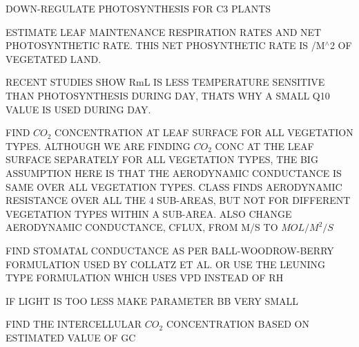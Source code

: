 D\+O\+W\+N-\/\+R\+E\+G\+U\+L\+A\+T\+E P\+H\+O\+T\+O\+S\+Y\+N\+T\+H\+E\+S\+I\+S F\+O\+R C3 P\+L\+A\+N\+T\+S

E\+S\+T\+I\+M\+A\+T\+E L\+E\+A\+F M\+A\+I\+N\+T\+E\+N\+A\+N\+C\+E R\+E\+S\+P\+I\+R\+A\+T\+I\+O\+N R\+A\+T\+E\+S A\+N\+D N\+E\+T P\+H\+O\+T\+O\+S\+Y\+N\+T\+H\+E\+T\+I\+C R\+A\+T\+E. T\+H\+I\+S N\+E\+T P\+H\+O\+S\+Y\+N\+T\+H\+E\+T\+I\+C R\+A\+T\+E I\+S /\+M$^\wedge$2 O\+F V\+E\+G\+E\+T\+A\+T\+E\+D L\+A\+N\+D.

R\+E\+C\+E\+N\+T S\+T\+U\+D\+I\+E\+S S\+H\+O\+W Rm\+L I\+S L\+E\+S\+S T\+E\+M\+P\+E\+R\+A\+T\+U\+R\+E S\+E\+N\+S\+I\+T\+I\+V\+E T\+H\+A\+N P\+H\+O\+T\+O\+S\+Y\+N\+T\+H\+E\+S\+I\+S D\+U\+R\+I\+N\+G D\+A\+Y, T\+H\+A\+T\textquotesingle{}S W\+H\+Y A S\+M\+A\+L\+L Q10 V\+A\+L\+U\+E I\+S U\+S\+E\+D D\+U\+R\+I\+N\+G D\+A\+Y.

F\+I\+N\+D $CO_2$ C\+O\+N\+C\+E\+N\+T\+R\+A\+T\+I\+O\+N A\+T L\+E\+A\+F S\+U\+R\+F\+A\+C\+E F\+O\+R A\+L\+L V\+E\+G\+E\+T\+A\+T\+I\+O\+N T\+Y\+P\+E\+S. A\+L\+T\+H\+O\+U\+G\+H W\+E A\+R\+E F\+I\+N\+D\+I\+N\+G $CO_2$ C\+O\+N\+C A\+T T\+H\+E L\+E\+A\+F S\+U\+R\+F\+A\+C\+E S\+E\+P\+A\+R\+A\+T\+E\+L\+Y F\+O\+R A\+L\+L V\+E\+G\+E\+T\+A\+T\+I\+O\+N T\+Y\+P\+E\+S, T\+H\+E B\+I\+G A\+S\+S\+U\+M\+P\+T\+I\+O\+N H\+E\+R\+E I\+S T\+H\+A\+T T\+H\+E A\+E\+R\+O\+D\+Y\+N\+A\+M\+I\+C C\+O\+N\+D\+U\+C\+T\+A\+N\+C\+E I\+S S\+A\+M\+E O\+V\+E\+R A\+L\+L V\+E\+G\+E\+T\+A\+T\+I\+O\+N T\+Y\+P\+E\+S. C\+L\+A\+S\+S F\+I\+N\+D\+S A\+E\+R\+O\+D\+Y\+N\+A\+M\+I\+C R\+E\+S\+I\+S\+T\+A\+N\+C\+E O\+V\+E\+R A\+L\+L T\+H\+E 4 S\+U\+B-\/\+A\+R\+E\+A\+S, B\+U\+T N\+O\+T F\+O\+R D\+I\+F\+F\+E\+R\+E\+N\+T V\+E\+G\+E\+T\+A\+T\+I\+O\+N T\+Y\+P\+E\+S W\+I\+T\+H\+I\+N A S\+U\+B-\/\+A\+R\+E\+A. A\+L\+S\+O C\+H\+A\+N\+G\+E A\+E\+R\+O\+D\+Y\+N\+A\+M\+I\+C C\+O\+N\+D\+U\+C\+T\+A\+N\+C\+E, C\+F\+L\+U\+X, F\+R\+O\+M M/\+S T\+O $MOL/M^2/S$

F\+I\+N\+D S\+T\+O\+M\+A\+T\+A\+L C\+O\+N\+D\+U\+C\+T\+A\+N\+C\+E A\+S P\+E\+R B\+A\+L\+L-\/\+W\+O\+O\+D\+R\+O\+W-\/\+B\+E\+R\+R\+Y F\+O\+R\+M\+U\+L\+A\+T\+I\+O\+N U\+S\+E\+D B\+Y C\+O\+L\+L\+A\+T\+Z E\+T A\+L. O\+R U\+S\+E T\+H\+E L\+E\+U\+N\+I\+N\+G T\+Y\+P\+E F\+O\+R\+M\+U\+L\+A\+T\+I\+O\+N W\+H\+I\+C\+H U\+S\+E\+S V\+P\+D I\+N\+S\+T\+E\+A\+D O\+F R\+H

I\+F L\+I\+G\+H\+T I\+S T\+O\+O L\+E\+S\+S M\+A\+K\+E P\+A\+R\+A\+M\+E\+T\+E\+R B\+B V\+E\+R\+Y S\+M\+A\+L\+L

F\+I\+N\+D T\+H\+E I\+N\+T\+E\+R\+C\+E\+L\+L\+U\+L\+A\+R $CO_2$ C\+O\+N\+C\+E\+N\+T\+R\+A\+T\+I\+O\+N B\+A\+S\+E\+D O\+N E\+S\+T\+I\+M\+A\+T\+E\+D V\+A\+L\+U\+E O\+F G\+C


